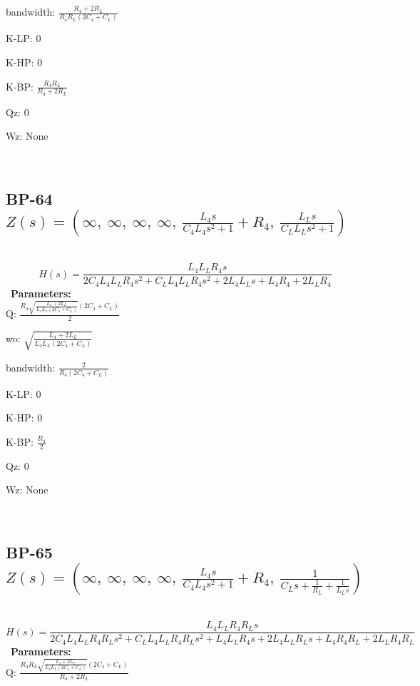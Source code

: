 \documentclass{article}
\begin{document}
bandwidth: $\frac{R_{4} + 2 R_{L}}{R_{4} R_{L} \left(2 C_{4} + C_{L}\right)}$\ 

K-LP: $0$\ 

K-HP: $0$\ 

K-BP: $\frac{R_{4} R_{L}}{R_{4} + 2 R_{L}}$\ 

Qz: $0$\ 

Wz: $\text{None}$\ 

\ 

\subsection{BP-64 $Z(s) = \left( \infty, \  \infty, \  \infty, \  \infty, \  \frac{L_{4} s}{C_{4} L_{4} s^{2} + 1} + R_{4}, \  \frac{L_{L} s}{C_{L} L_{L} s^{2} + 1}\right)$ } \ 
\textbf{\[H(s) = \frac{L_{4} L_{L} R_{4} s}{2 C_{4} L_{4} L_{L} R_{4} s^{2} + C_{L} L_{4} L_{L} R_{4} s^{2} + 2 L_{4} L_{L} s + L_{4} R_{4} + 2 L_{L} R_{4}}\] } \ 
\textbf{Parameters:}\\ 

Q: $\frac{R_{4} \sqrt{\frac{L_{4} + 2 L_{L}}{L_{4} L_{L} \left(2 C_{4} + C_{L}\right)}} \left(2 C_{4} + C_{L}\right)}{2}$\ 

wo: $\sqrt{\frac{L_{4} + 2 L_{L}}{L_{4} L_{L} \left(2 C_{4} + C_{L}\right)}}$\ 

bandwidth: $\frac{2}{R_{4} \left(2 C_{4} + C_{L}\right)}$\ 

K-LP: $0$\ 

K-HP: $0$\ 

K-BP: $\frac{R_{4}}{2}$\ 

Qz: $0$\ 

Wz: $\text{None}$\ 

\ 

\subsection{BP-65 $Z(s) = \left( \infty, \  \infty, \  \infty, \  \infty, \  \frac{L_{4} s}{C_{4} L_{4} s^{2} + 1} + R_{4}, \  \frac{1}{C_{L} s + \frac{1}{R_{L}} + \frac{1}{L_{L} s}}\right)$ } \ 
\textbf{\[H(s) = \frac{L_{4} L_{L} R_{4} R_{L} s}{2 C_{4} L_{4} L_{L} R_{4} R_{L} s^{2} + C_{L} L_{4} L_{L} R_{4} R_{L} s^{2} + L_{4} L_{L} R_{4} s + 2 L_{4} L_{L} R_{L} s + L_{4} R_{4} R_{L} + 2 L_{L} R_{4} R_{L}}\] } \ 
\textbf{Parameters:}\\ 

Q: $\frac{R_{4} R_{L} \sqrt{\frac{L_{4} + 2 L_{L}}{L_{4} L_{L} \left(2 C_{4} + C_{L}\right)}} \left(2 C_{4} + C_{L}\right)}{R_{4} + 2 R_{L}}$\ 
\end{document}
